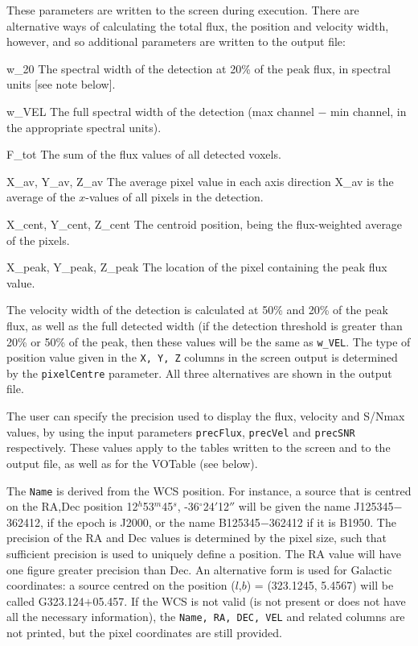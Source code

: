 These parameters are written to the screen during execution. There are
alternative ways of calculating the total flux, the position and
velocity width, however, and so additional parameters are written to
the output file:
\begin{Lentry}
\item[{w\_20}] The spectral width of the detection at 20\% of the peak
  flux, in spectral units [see note below].
\item[{w\_VEL}] The full spectral width of the detection (max channel
  $-$ min channel, in the appropriate spectral units).
\item[{F\_tot}] The sum of the flux values of all detected voxels.
\item[{X\_av, Y\_av, Z\_av}] The average pixel value in each
  axis direction \ie X\_av is the average of the $x$-values of all
  pixels in the detection.
\item[{X\_cent, Y\_cent, Z\_cent}] The centroid position, being
  the flux-weighted average of the pixels.
\item[{X\_peak, Y\_peak, Z\_peak}] The location of the pixel
  containing the peak flux value.
\end{Lentry}

The velocity width of the detection is calculated at 50\% and 20\% of
the peak flux, as well as the full detected width (if the detection
threshold is greater than 20\% or 50\% of the peak, then these values
will be the same as \texttt{w\_VEL}. The type of position value given
in the \texttt{X, Y, Z} columns in the screen output is determined by
the \texttt{pixelCentre} parameter. All three alternatives are shown
in the output file.

The user can specify the precision used to display the flux, velocity
and S/Nmax values, by using the input parameters \texttt{precFlux},
\texttt{precVel} and \texttt{precSNR} respectively. These values apply
to the tables written to the screen and to the output file, as well as
for the VOTable (see below).

The \texttt{Name} is derived from the WCS position. For instance, a
source that is centred on the RA,Dec position 12$^h$53$^m$45$^s$,
-36$^\circ$24$'$12$''$ will be given the name J125345$-$362412, if the
epoch is J2000, or the name B125345$-$362412 if it is B1950. The
precision of the RA and Dec values is determined by the pixel size,
such that sufficient precision is used to uniquely define a
position. The RA value will have one figure greater precision than
Dec. An alternative form is used for Galactic coordinates: a source
centred on the position ($l$,$b$) = (323.1245, 5.4567) will be called
G323.124$+$05.457. If the WCS is not valid (\ie is not present or does
not have all the necessary information), the \texttt{Name, RA, DEC,
  VEL} and related columns are not printed, but the pixel coordinates
are still provided.

